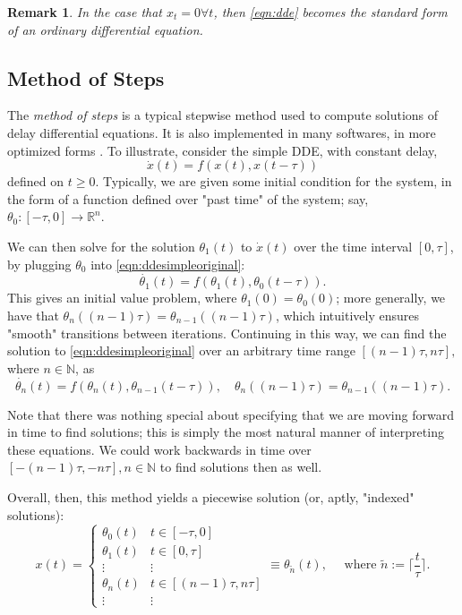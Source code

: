 \documentclass[12pt]{article}
\newtheorem{remark}{Remark}
\begin{document}
\begin{remark}
    In the case that $x_t = 0 \forall t$, then \cref{eqn:dde} becomes the standard form of an ordinary differential equation.
\end{remark}

\subsection{Method of Steps}

The \emph{method of steps} is a typical stepwise method used to compute solutions of delay differential equations. It is also implemented in many softwares, in more optimized forms \cite{DDEtext}\cite{functionalDDEtext}\cite{ndsolvedde}. To illustrate, consider the simple DDE, with constant delay,
\begin{equation}\label{eqn:ddesimpleoriginal}
    \dot{x}(t) = f(x(t), x(t-\tau))
\end{equation}
defined on $t \geq 0$. Typically, we are given some initial condition for the system, in the form of a function defined over "past time" of the system; say, $\theta_0 : [- \tau, 0] \to \mathbb{R}^n$. 

We can then solve for the solution $\theta_1(t)$ to $\dot{x}(t)$ over the time interval $[0, \tau]$, by plugging $\theta_0$ into \cref{eqn:ddesimpleoriginal}:\begin{equation}
    \dot{\theta_1}(t) = f(\theta_1(t), \theta_0 (t - \tau)).
\end{equation}
This gives an initial value problem, where $\theta_1(0) = \theta_0(0)$; more generally, we have that $\theta_n((n-1)\tau) = \theta_{n-1}((n-1)\tau)$, which intuitively ensures "smooth" transitions between iterations. Continuing in this way, we can find the solution to \cref{eqn:ddesimpleoriginal} over an arbitrary time range $[(n-1)\tau, n\tau],$ where $n \in \mathbb{N}$, as 
 \begin{equation}
    \dot{\theta_n}(t) = f(\theta_{n}(t), \theta_{n-1}(t-\tau)), \quad \theta_n((n-1)\tau) = \theta_{n-1}((n-1)\tau).
\end{equation}

Note that there was nothing special about specifying that we are moving forward in time to find solutions; this is simply the most natural manner of interpreting these equations. We could work backwards in time over $[-(n-1)\tau, -n \tau], n \in \mathbb{N}$ to find solutions then as well.

Overall, then, this method yields a piecewise solution (or, aptly, "indexed" solutions):
\begin{equation}
    x(t) = \begin{cases}
        \theta_0(t) & t \in [- \tau, 0]\\
        \theta_1(t) & t \in [0, \tau]\\
        \vdots & \vdots \\
        \theta_n(t) & t \in [(n-1)\tau, n\tau]\\
        \vdots & \vdots
    \end{cases} \equiv \theta_{\tilde{n}}(t), \quad \text{ where } \tilde{n} :=  \lceil\frac{t}{\tau}\rceil.
\end{equation}
\end{document}
